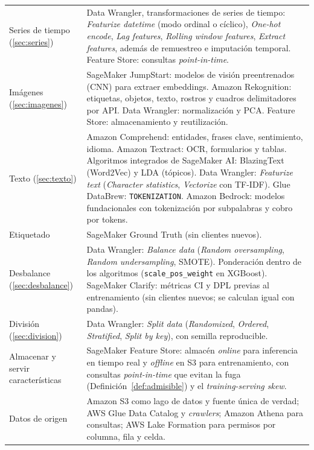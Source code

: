 \documentclass[11pt]{article}
\theoremstyle{definition}
\theoremstyle{remark}
\begin{document}
\begin{center}
\begin{tabularx}{\linewidth}{@{}>{\raggedright\arraybackslash}p{3.4cm}Y@{}}
Series de tiempo (\ref{sec:series}) & Data Wrangler, transformaciones de series de tiempo: \emph{Featurize datetime} (modo ordinal o cíclico), \emph{One-hot encode}, \emph{Lag features}, \emph{Rolling window features}, \emph{Extract features}, además de remuestreo e imputación temporal. Feature Store: consultas \emph{point-in-time}.\\
Imágenes (\ref{sec:imagenes}) & SageMaker JumpStart: modelos de visión preentrenados (CNN) para extraer embeddings. Amazon Rekognition: etiquetas, objetos, texto, rostros y cuadros delimitadores por API. Data Wrangler: normalización y PCA. Feature Store: almacenamiento y reutilización.\\
Texto (\ref{sec:texto}) & Amazon Comprehend: entidades, frases clave, sentimiento, idioma. Amazon Textract: OCR, formularios y tablas. Algoritmos integrados de SageMaker AI: BlazingText (Word2Vec) y LDA (tópicos). Data Wrangler: \emph{Featurize text} (\emph{Character statistics}, \emph{Vectorize} con TF-IDF). Glue DataBrew: \texttt{TOKENIZATION}. Amazon Bedrock: modelos fundacionales con tokenización por subpalabras y cobro por tokens.\\
Etiquetado & SageMaker Ground Truth (sin clientes nuevos).\\
Desbalance (\ref{sec:desbalance}) & Data Wrangler: \emph{Balance data} (\emph{Random oversampling}, \emph{Random undersampling}, SMOTE). Ponderación dentro de los algoritmos (\texttt{scale\_pos\_weight} en XGBoost). SageMaker Clarify: métricas CI y DPL previas al entrenamiento (sin clientes nuevos; se calculan igual con pandas).\\
División (\ref{sec:division}) & Data Wrangler: \emph{Split data} (\emph{Randomized}, \emph{Ordered}, \emph{Stratified}, \emph{Split by key}), con semilla reproducible.\\
Almacenar y servir características & SageMaker Feature Store: almacén \emph{online} para inferencia en tiempo real y \emph{offline} en S3 para entrenamiento, con consultas \emph{point-in-time} que evitan la fuga (Definición~\ref{def:admisible}) y el \emph{training-serving skew}.\\
Datos de origen & Amazon S3 como lago de datos y fuente única de verdad; AWS Glue Data Catalog y \emph{crawlers}; Amazon Athena para consultas; AWS Lake Formation para permisos por columna, fila y celda.\\
\bottomrule
\end{tabularx}
\end{center}
\end{document}
